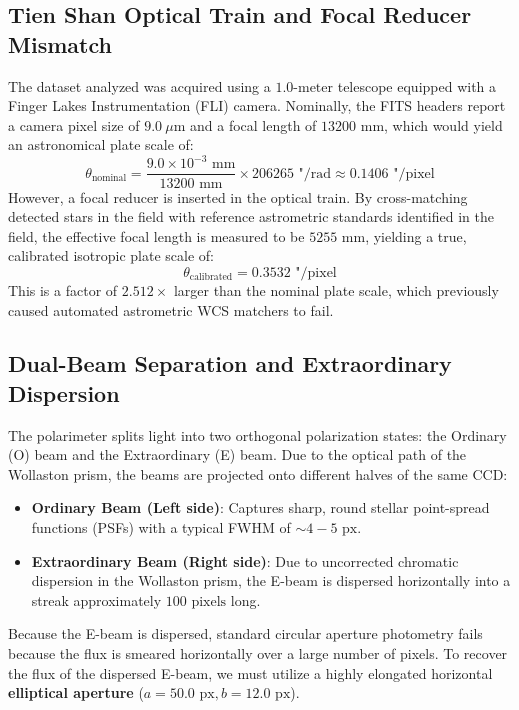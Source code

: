 \documentclass[11pt,a4paper]{article}
\begin{document}
\subsection{Tien Shan Optical Train and Focal Reducer Mismatch}
The dataset analyzed was acquired using a $1.0\text{-meter}$ telescope equipped with a Finger Lakes Instrumentation (FLI) camera. Nominally, the FITS headers report a camera pixel size of $9.0\ \mu\text{m}$ and a focal length of $13200\text{ mm}$, which would yield an astronomical plate scale of:
\begin{equation}
\theta_{\text{nominal}} = \frac{9.0\times 10^{-3}\text{ mm}}{13200\text{ mm}} \times 206265\text{ "/rad} \approx 0.1406\text{ "/pixel}
\end{equation}
However, a focal reducer is inserted in the optical train. By cross-matching detected stars in the field with reference astrometric standards identified in the field, the effective focal length is measured to be $5255\text{ mm}$, yielding a true, calibrated isotropic plate scale of:
\begin{equation}
\theta_{\text{calibrated}} = 0.3532\text{ "/pixel}
\end{equation}
This is a factor of $2.512\times$ larger than the nominal plate scale, which previously caused automated astrometric WCS matchers to fail.

\subsection{Dual-Beam Separation and Extraordinary Dispersion}
The polarimeter splits light into two orthogonal polarization states: the Ordinary (O) beam and the Extraordinary (E) beam. Due to the optical path of the Wollaston prism, the beams are projected onto different halves of the same CCD:
\begin{itemize}
    \item \textbf{Ordinary Beam (Left side)}: Captures sharp, round stellar point-spread functions (PSFs) with a typical FWHM of $\sim 4-5\text{ px}$.
    \item \textbf{Extraordinary Beam (Right side)}: Due to uncorrected chromatic dispersion in the Wollaston prism, the E-beam is dispersed horizontally into a streak approximately $100\text{ pixels}$ long.
\end{itemize}

Because the E-beam is dispersed, standard circular aperture photometry fails because the flux is smeared horizontally over a large number of pixels. To recover the flux of the dispersed E-beam, we must utilize a highly elongated horizontal \textbf{elliptical aperture} ($a=50.0\text{ px}, b=12.0\text{ px}$).
\end{document}
